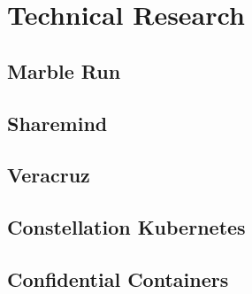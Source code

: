 
\chapter{Technical Research}

\section{Marble Run}

\section{Sharemind}

\section{Veracruz}

\section{Constellation Kubernetes}

\section{Confidential Containers}
